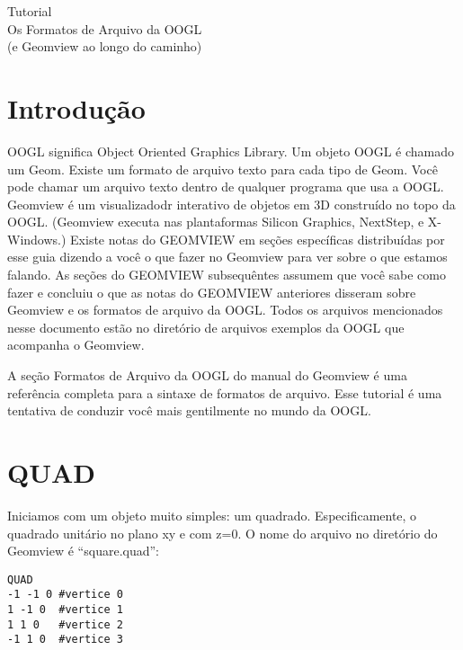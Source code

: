 \documentclass[12pt,a4paper]{book}
\begin{document}

\vspace*{6cm}
\huge
\begin{center}
Tutorial\\
Os Formatos de Arquivo da OOGL\\
(e Geomview ao longo do caminho)
\end{center}
\normalsize
\vspace*{5cm}
\newpage
\tableofcontents

\chapter{Introdu\c{c}\~ao}

OOGL significa Object Oriented Graphics Library.  Um objeto OOGL \'e
chamado um Geom. Existe um formato de arquivo texto para cada tipo de Geom. Voc\^e
pode chamar um arquivo texto dentro de qualquer programa que usa a OOGL. Geomview \'e um
visualizadodr interativo de objetos em 3D constru\'ido no topo da OOGL. (Geomview executa nas
plantaformas Silicon Graphics, NextStep, e X-Windows.) Existe
notas do GEOMVIEW em se\c{c}\~oes espec\'ificas distribu\'idas por esse guia dizendo
a voc\^e o que fazer no Geomview para ver sobre o que estamos falando. As se\c{c}\~oes do GEOMVIEW
subsequ\^entes assumem que voc\^e sabe como fazer e concluiu o que as notas do GEOMVIEW anteriores
disseram sobre Geomview e os formatos de arquivo da OOGL. Todos os arquivos mencionados nesse documento est\~ao no
diret\'{o}rio de arquivos exemplos da OOGL que acompanha o Geomview.

A se\c{c}\~ao Formatos de Arquivo da OOGL do manual do Geomview \'e uma refer\^encia
completa para a sintaxe de formatos de arquivo. Esse tutorial \'e uma tentativa
de conduzir voc\^e mais gentilmente no mundo da OOGL.

\chapter{QUAD}

Iniciamos com um objeto muito simples: um quadrado. Especificamente, o quadrado
unit\'ario no plano xy e com z=0. O nome do arquivo no diret\'{o}rio do Geomview \'e ``square.quad'':

\begin{verbatim}
QUAD
-1 -1 0 #vertice 0
1 -1 0  #vertice 1
1 1 0   #vertice 2
-1 1 0  #vertice 3
\end{verbatim}
\end{document}
